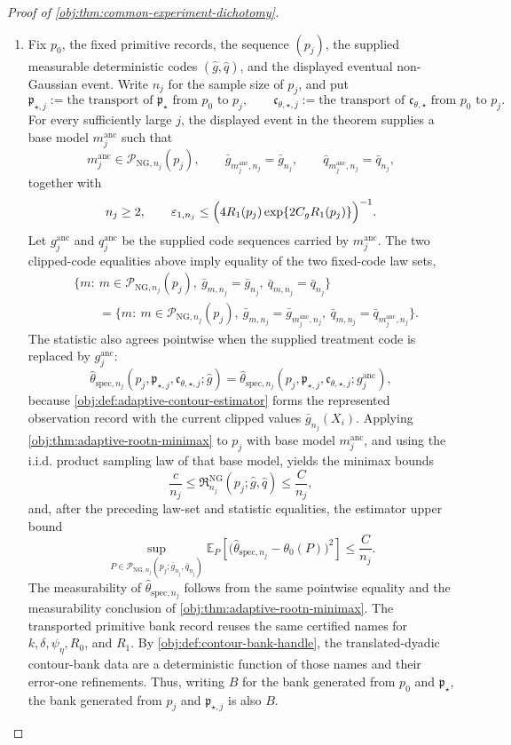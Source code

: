 \begin{proof}[Proof of \cref{obj:thm:common-experiment-dichotomy}]
\begin{enumerate}
\item
Fix \(p_0\), the fixed primitive records, the sequence \((p_j)\), the supplied measurable deterministic codes \((\widehat g,\widehat q)\), and the displayed eventual non-Gaussian event. Write \(n_j\) for the sample size of \(p_j\), and put
\[
\mathfrak p_{\star,j}:=\text{the transport of }\mathfrak p_{\star}\text{ from }p_0\text{ to }p_j,
\qquad
\mathfrak c_{\theta,\star,j}:=\text{the transport of }\mathfrak c_{\theta,\star}\text{ from }p_0\text{ to }p_j.
\]
For every sufficiently large \(j\), the displayed event in the theorem supplies a base model
\(m_j^{\mathrm{anc}}\) such that
\[
m_j^{\mathrm{anc}}\in\mathcal P_{\mathrm{NG},n_j}(p_j),
\qquad
\bar g_{m_j^{\mathrm{anc}},n_j}=\bar g_{n_j},
\qquad
\bar q_{m_j^{\mathrm{anc}},n_j}=\bar q_{n_j},
\]
together with
\[
n_j\ge2,
\qquad
\varepsilon_{1,n_j}\le
\Bigl(4R_1(p_j)\exp\{2C_gR_1(p_j)\}\Bigr)^{-1}.
\]
Let \(g_j^{\mathrm{anc}}\) and \(q_j^{\mathrm{anc}}\) be the supplied code sequences carried by
\(m_j^{\mathrm{anc}}\). The two clipped-code equalities above imply equality of the two fixed-code law sets,
\[
\begin{aligned}
&\{m:\ m\in\mathcal P_{\mathrm{NG},n_j}(p_j),\ \bar g_{m,n_j}=\bar g_{n_j},\ \bar q_{m,n_j}=\bar q_{n_j}\}  \\
&\qquad =
\{m:\ m\in\mathcal P_{\mathrm{NG},n_j}(p_j),\ \bar g_{m,n_j}=\bar g_{m_j^{\mathrm{anc}},n_j},\ \bar q_{m,n_j}=\bar q_{m_j^{\mathrm{anc}},n_j}\}.
\end{aligned}
\]
The statistic also agrees pointwise when the supplied treatment code is replaced by
\(g_j^{\mathrm{anc}}\):
\[
\widehat\theta_{\mathrm{spec},n_j}
(p_j,\mathfrak p_{\star,j},\mathfrak c_{\theta,\star,j};\widehat g)
=
\widehat\theta_{\mathrm{spec},n_j}
(p_j,\mathfrak p_{\star,j},\mathfrak c_{\theta,\star,j};g_j^{\mathrm{anc}}),
\]
because \cref{obj:def:adaptive-contour-estimator} forms the represented observation record with the current clipped values \(\bar g_{n_j}(X_i)\). Applying \cref{obj:thm:adaptive-rootn-minimax} to \(p_j\) with base model
\(m_j^{\mathrm{anc}}\), and using the i.i.d. product sampling law of that base model, yields the minimax bounds
\[
\frac{c}{n_j}
\le
\mathfrak R_{n_j}^{\mathrm{NG}}(p_j;\widehat g,\widehat q)
\le
\frac{C}{n_j},
\]
and, after the preceding law-set and statistic equalities, the estimator upper bound
\[
\sup_{P\in\mathcal P_{\mathrm{NG},n_j}(p_j;\bar g_{n_j},\bar q_{n_j})}
\mathbb E_P\!\left[
\bigl(\widehat\theta_{\mathrm{spec},n_j}-\theta_0(P)\bigr)^2
\right]
\le
\frac{C}{n_j}.
\]
The measurability of
\(\widehat\theta_{\mathrm{spec},n_j}\) follows from the same pointwise equality and the measurability conclusion of
\cref{obj:thm:adaptive-rootn-minimax}. The transported primitive bank record reuses the same certified names for
\(k,\delta,\psi_{\eta},R_0\), and \(R_1\). By \cref{obj:def:contour-bank-handle}, the translated-dyadic contour-bank data are a deterministic function of those names and their error-one refinements. Thus, writing
\(B\) for the bank generated from \(p_0\) and \(\mathfrak p_{\star}\), the bank generated from
\(p_j\) and \(\mathfrak p_{\star,j}\) is also \(B\).


\end{enumerate}
\end{proof}
